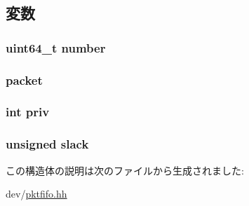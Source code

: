 \subsection{変数}
\hypertarget{structPacketFifoEntry_ae96d8ae9cc03cb8691b3582c71dcf371}{
\subsubsection[{number}]{\setlength{\rightskip}{0pt plus 5cm}uint64\_\-t {\bf number}}}
\label{structPacketFifoEntry_ae96d8ae9cc03cb8691b3582c71dcf371}
\hypertarget{structPacketFifoEntry_a8bd0d3f7eb9e8d7189c7027028a5fac0}{
\subsubsection[{packet}]{ {\bf packet}}}
\label{structPacketFifoEntry_a8bd0d3f7eb9e8d7189c7027028a5fac0}
\hypertarget{structPacketFifoEntry_abf581830e96928ca11dbfce50d99aa45}{
\subsubsection[{priv}]{\setlength{\rightskip}{0pt plus 5cm}int {\bf priv}}}
\label{structPacketFifoEntry_abf581830e96928ca11dbfce50d99aa45}
\hypertarget{structPacketFifoEntry_afac9472c53898cb57e4cbfbf21a822cd}{
\subsubsection[{slack}]{\setlength{\rightskip}{0pt plus 5cm}unsigned {\bf slack}}}
\label{structPacketFifoEntry_afac9472c53898cb57e4cbfbf21a822cd}


この構造体の説明は次のファイルから生成されました:\begin{DoxyCompactItemize}
\item 
dev/\hyperlink{pktfifo_8hh}{pktfifo.hh}\end{DoxyCompactItemize}

